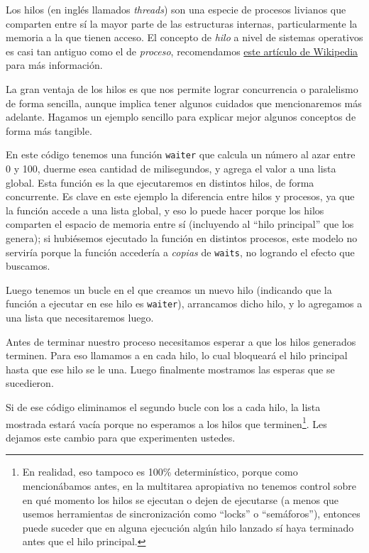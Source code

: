 Los hilos (en inglés llamados \textit{threads}) son una especie de procesos livianos que comparten entre sí la mayor parte de las estructuras internas, particularmente la memoria a la que tienen acceso. El concepto de \textit{hilo} a nivel de sistemas operativos es casi tan antiguo como el de \textit{proceso}, recomendamos \href{https://es.wikipedia.org/wiki/Hilo_(inform%C3%A1tica)}{este artículo de Wikipedia} para más información.

La gran ventaja de los hilos es que nos permite lograr concurrencia o paralelismo de forma sencilla, aunque implica tener algunos cuidados que mencionaremos más adelante. Hagamos un ejemplo sencillo para explicar mejor algunos conceptos de forma más tangible.


En este código tenemos una función \texttt{waiter} que calcula un número al azar entre 0 y 100, duerme esea cantidad de milisegundos, y agrega el valor a una lista global. Esta función es la que ejecutaremos en distintos hilos, de forma concurrente. Es clave en este ejemplo la diferencia entre hilos y procesos, ya que la función accede a una lista global, y eso lo puede hacer porque los hilos comparten el espacio de memoria entre sí (incluyendo al ``hilo principal'' que los genera); si hubiésemos ejecutado la función en distintos procesos, este modelo no serviría porque la función accedería a \textit{copias} de \texttt{waits}, no logrando el efecto que buscamos.

Luego tenemos un bucle  en el que creamos un nuevo hilo (indicando que la función a ejecutar en ese hilo es \texttt{waiter}), arrancamos dicho hilo, y lo agregamos a una lista que necesitaremos luego.

Antes de terminar nuestro proceso necesitamos esperar a que los hilos generados terminen. Para eso llamamos a  en cada hilo, lo cual bloqueará el hilo principal hasta que ese hilo se le una. Luego finalmente mostramos las esperas que se sucedieron.


Si de ese código eliminamos el segundo bucle con los  a cada hilo, la lista mostrada estará vacía porque no esperamos a los hilos que terminen\footnote{En realidad, eso tampoco es 100\% determinístico, porque como mencionábamos antes, en la multitarea apropiativa no tenemos control sobre en qué momento los hilos se ejecutan o dejen de ejecutarse (a menos que usemos herramientas de sincronización como ``locks'' o ``semáforos''), entonces puede suceder que en alguna ejecución algún hilo lanzado sí haya terminado antes que el hilo principal.}. Les dejamos este cambio para que experimenten ustedes.

